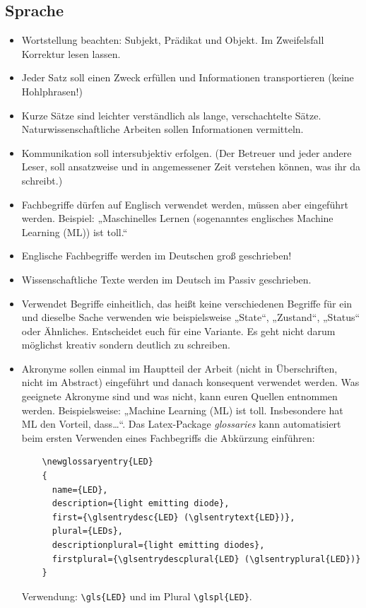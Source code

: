 \subsection*{Sprache}
\begin{itemize}
    \item Wortstellung beachten: Subjekt, Prädikat und Objekt. Im Zweifelsfall Korrektur lesen lassen.
    \item Jeder Satz soll einen Zweck erfüllen und Informationen transportieren (keine Hohlphrasen!)
    \item Kurze Sätze sind leichter verständlich als lange, verschachtelte Sätze. Naturwissenschaftliche Arbeiten sollen Informationen vermitteln.
    \item Kommunikation soll intersubjektiv erfolgen. (Der Betreuer und jeder andere Leser, soll ansatzweise und in angemessener Zeit verstehen können, was ihr da schreibt.)
    \item Fachbegriffe dürfen auf Englisch verwendet werden, müssen aber eingeführt werden. Beispiel: „Maschinelles Lernen (sogenanntes englisches Machine Learning (ML)) ist toll.“
    \item Englische Fachbegriffe werden im Deutschen groß geschrieben!
    \item Wissenschaftliche Texte werden im Deutsch im Passiv geschrieben.
    \item Verwendet Begriffe einheitlich, das heißt keine verschiedenen Begriffe für ein und dieselbe Sache verwenden wie beispielsweise „State“, „Zustand“, „Status“ oder Ähnliches. Entscheidet euch für eine Variante. Es geht nicht darum möglichst kreativ sondern deutlich zu schreiben.
    \item Akronyme sollen einmal im Hauptteil der Arbeit (nicht in Überschriften, nicht im Abstract) eingeführt und danach konsequent verwendet werden. Was geeignete Akronyme sind und was nicht, kann euren Quellen entnommen werden. Beispielsweise: „Machine Learning (ML) ist toll. Insbesondere hat ML den Vorteil, dass\ldots{}“. Das Latex-Package \textit{glossaries} kann automatisiert beim ersten Verwenden eines Fachbegriffs die Abkürzung einführen:
    \begin{verbatim}
    \newglossaryentry{LED}
    {
      name={LED},
      description={light emitting diode},
      first={\glsentrydesc{LED} (\glsentrytext{LED})},
      plural={LEDs},
      descriptionplural={light emitting diodes},
      firstplural={\glsentrydescplural{LED} (\glsentryplural{LED})}
    }
    \end{verbatim}
    Verwendung: {\lstset{basicstyle=\ttfamily\bfseries}\lstinline|\gls{LED}|} und im Plural {\lstset{basicstyle=\ttfamily\bfseries}\lstinline|\glspl{LED}|}.
\end{itemize}

